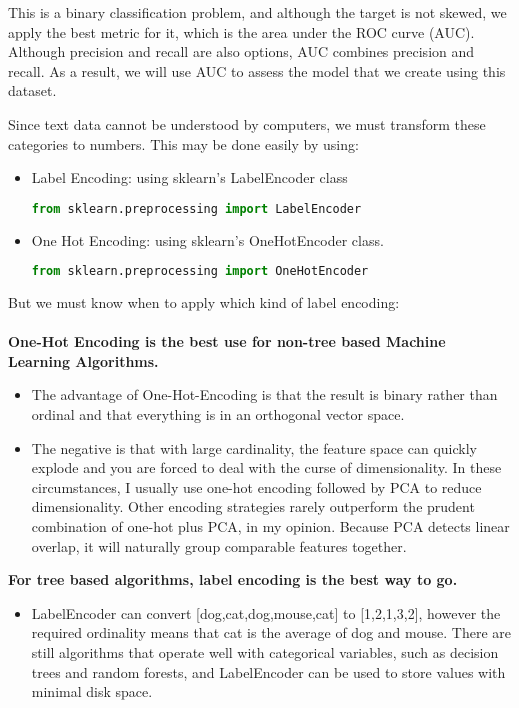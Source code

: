 This is a binary classification problem, and although the target is not skewed, we apply the best metric for it, which is the area under the ROC curve (AUC). Although precision and recall are also options, AUC combines precision and recall. As a result, we will use AUC to assess the model that we create using this dataset.

Since text data cannot be understood by computers, we must transform these categories to numbers. This may be done easily by using:

\begin{itemize}
	\item{Label Encoding: using sklearn's LabelEncoder class}
	\begin{lstlisting}[language=Python, caption=Label Encoder, numbers=none]
	from sklearn.preprocessing import LabelEncoder\end{lstlisting}
	\item{One Hot Encoding: using sklearn's OneHotEncoder class.}
	\begin{lstlisting}[language=Python, caption=Get dummies, numbers=none]
	from sklearn.preprocessing import OneHotEncoder\end{lstlisting}
\end{itemize}
But we must know when to apply which kind of label encoding: \\
\\
\noindent
\textbf{One-Hot Encoding is the best use for non-tree based Machine Learning Algorithms.}
\begin{itemize}
	\item The advantage of One-Hot-Encoding is that the result is binary rather than ordinal and that everything is in an orthogonal vector space.
	\item The negative is that with large cardinality, the feature space can quickly explode and you are forced to deal with the curse of dimensionality. In these circumstances, I usually use one-hot encoding followed by PCA to reduce dimensionality. Other encoding strategies rarely outperform the prudent combination of one-hot plus PCA, in my opinion. Because PCA detects linear overlap, it will naturally group comparable features together.
\end{itemize}

\noindent
\textbf{For tree based algorithms, label encoding is the best way to go.}

\begin{itemize}
	\item{LabelEncoder can convert [dog,cat,dog,mouse,cat] to [1,2,1,3,2], however the required ordinality means that cat is the average of dog and mouse. There are still algorithms that operate well with categorical variables, such as decision trees and random forests, and LabelEncoder can be used to store values with minimal disk space.}
\end{itemize}

